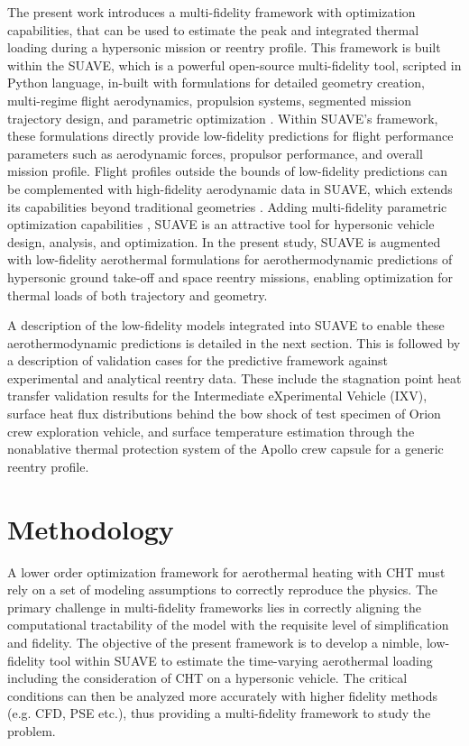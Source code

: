 \documentclass[%
 aip,
 amsmath,amssymb,
preprint,%
]{revtex4-1}
\begin{document}
The present work introduces a multi-fidelity framework with optimization capabilities, that can be used to estimate the peak and integrated thermal loading during a hypersonic mission or reentry profile. This framework is built within the SUAVE, which is a powerful open-source multi-fidelity tool, scripted in Python language, in-built with formulations for detailed geometry creation, multi-regime flight aerodynamics, propulsion systems, segmented mission trajectory design, and parametric optimization \citep{lukaczyk_suave_2015}. Within SUAVE's framework, these formulations directly provide low-fidelity predictions for flight performance parameters such as aerodynamic forces, propulsor performance, and overall mission profile. Flight profiles outside the bounds of low-fidelity predictions can be complemented with high-fidelity aerodynamic data in SUAVE, which extends its capabilities beyond traditional geometries \citep{macdonald_suave_2017}. Adding multi-fidelity parametric optimization capabilities \citep{macdonald_suave_2017-1}, SUAVE is an attractive tool for hypersonic vehicle design, analysis, and optimization. In the present study, SUAVE is augmented with low-fidelity aerothermal formulations for aerothermodynamic predictions of hypersonic ground take-off and space reentry missions, enabling optimization for thermal loads of both trajectory and geometry.

A description of the low-fidelity models integrated into SUAVE to enable these aerothermodynamic predictions is detailed in the next section. This is followed by a description of validation cases for the predictive framework against experimental and analytical reentry data. These include the stagnation point heat transfer validation results for the Intermediate eXperimental Vehicle (IXV), surface heat flux distributions behind the bow shock of test specimen of Orion crew exploration vehicle, and surface temperature estimation through the nonablative thermal protection system of the Apollo crew capsule for a generic reentry profile. 


\section{Methodology}
A lower order optimization framework for aerothermal heating with CHT must rely on a set of modeling assumptions to correctly reproduce the physics. The primary challenge in multi-fidelity frameworks lies in correctly aligning the computational tractability of the model with the requisite level of simplification and fidelity. The objective of the present framework is to develop a nimble, low-fidelity tool within SUAVE to estimate the time-varying aerothermal loading including the consideration of CHT on a hypersonic vehicle. The critical conditions can then be analyzed more accurately with higher fidelity methods (e.g. CFD, PSE etc.), thus providing a multi-fidelity framework to study the problem.
\end{document}
